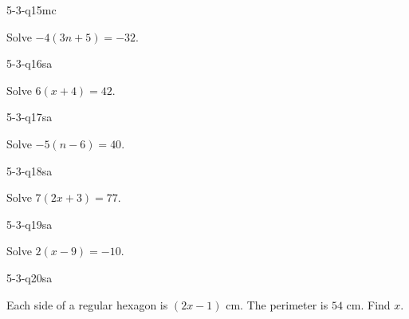 \begin{practiceQuestion}{5-3-q15}{mc}
\begin{questionText}
Solve $-4(3n + 5) = -32$.
\end{questionText}
\end{practiceQuestion}


\begin{practiceQuestion}{5-3-q16}{sa}
\begin{questionText}
Solve $6(x + 4) = 42$.
\end{questionText}
\end{practiceQuestion}

\begin{practiceQuestion}{5-3-q17}{sa}
\begin{questionText}
Solve $-5(n - 6) = 40$.
\end{questionText}
\end{practiceQuestion}

\begin{practiceQuestion}{5-3-q18}{sa}
\begin{questionText}
Solve $7(2x + 3) = 77$.
\end{questionText}
\end{practiceQuestion}

\begin{practiceQuestion}{5-3-q19}{sa}
\begin{questionText}
Solve $2(x - 9) = -10$.
\end{questionText}
\end{practiceQuestion}

\begin{practiceQuestion}{5-3-q20}{sa}
\begin{questionText}
Each side of a regular hexagon is $(2x - 1)$ cm. The perimeter is $54$ cm. Find $x$.
\end{questionText}
\end{practiceQuestion}

